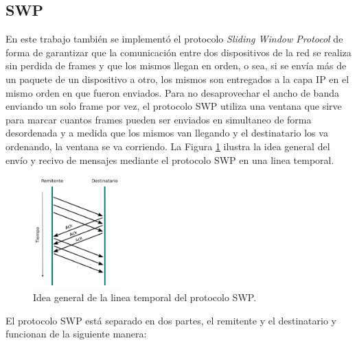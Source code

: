 \documentclass[10pt,a4paper]{article}
\begin{document}
\subsection{SWP}

En este trabajo también se implementó el protocolo \textit{Sliding Window Protocol} de forma de garantizar que la comunicación entre dos dispositivos de la red se realiza sin perdida de frames y que los mismos llegan en orden, o sea, si se envía más de un paquete de un dispositivo a otro, los mismos son entregados a la capa IP en el mismo orden en que fueron enviados. Para no desaprovechar el ancho de banda enviando un solo frame por vez, el protocolo SWP utiliza una ventana que sirve para marcar cuantos frames pueden ser enviados en simultaneo de forma desordenada y a medida que los mismos van llegando y el destinatario los va ordenando, la ventana se va corriendo. La Figura \ref{figure: swp timeline} ilustra la idea general del envío y recivo de mensajes mediante el protocolo SWP en una linea temporal.\\

\begin{figure}[!htb]
    \centering
    \includegraphics[width = 0.3\textwidth]{img/png/swp-timeline.png}
    \caption{Idea general de la linea temporal del protocolo SWP.}
    \label{figure: swp timeline}
\end{figure}

El protocolo SWP está separado en dos partes, el remitente y el destinatario y funcionan de la siguiente manera:
\end{document}
